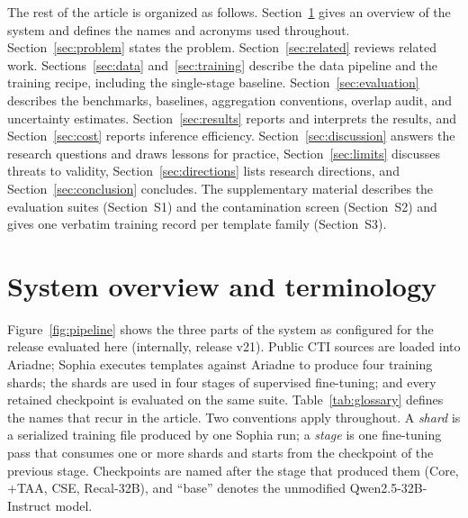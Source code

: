 \documentclass[a4paper,fleqn]{cas-dc}
\begin{document}
The rest of the article is organized as follows. Section~\ref{sec:overview} gives an overview of the system and defines the names and acronyms used throughout. Section~\ref{sec:problem} states the problem. Section~\ref{sec:related} reviews related work. Sections~\ref{sec:data} and~\ref{sec:training} describe the data pipeline and the training recipe, including the single-stage baseline. Section~\ref{sec:evaluation} describes the benchmarks, baselines, aggregation conventions, overlap audit, and uncertainty estimates. Section~\ref{sec:results} reports and interprets the results, and Section~\ref{sec:cost} reports inference efficiency. Section~\ref{sec:discussion} answers the research questions and draws lessons for practice, Section~\ref{sec:limits} discusses threats to validity, Section~\ref{sec:directions} lists research directions, and Section~\ref{sec:conclusion} concludes. The supplementary material describes the evaluation suites (Section~S1) and the contamination screen (Section~S2) and gives one verbatim training record per template family (Section~S3).

\section{System overview and terminology}\label{sec:overview}
Figure~\ref{fig:pipeline} shows the three parts of the system as configured for the release evaluated here (internally, release v21). Public CTI sources are loaded into Ariadne; Sophia executes templates against Ariadne to produce four training shards; the shards are used in four stages of supervised fine-tuning; and every retained checkpoint is evaluated on the same suite. Table~\ref{tab:glossary} defines the names that recur in the article. Two conventions apply throughout. A \emph{shard} is a serialized training file produced by one Sophia run; a \emph{stage} is one fine-tuning pass that consumes one or more shards and starts from the checkpoint of the previous stage. Checkpoints are named after the stage that produced them (Core, +TAA, CSE, Recal-32B), and ``base'' denotes the unmodified Qwen2.5-32B-Instruct model.
\end{document}

